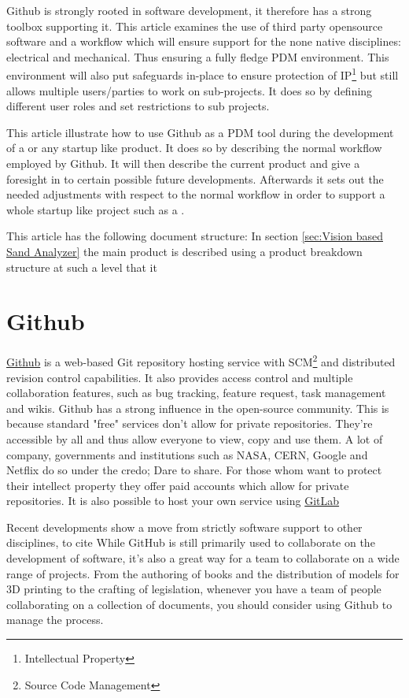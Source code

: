 \documentclass[fleqn,10pt]{SelfArx} %
\begin{document}
Github is strongly rooted in software development, it therefore has a strong toolbox supporting it. This article examines the use of third party opensource software and a workflow which will ensure support for the none native disciplines: electrical and mechanical. Thus ensuring a fully fledge PDM environment. This environment will also put safeguards in-place to ensure protection of IP\footnote{Intellectual Property} but still allows multiple users/parties to work on sub-projects. It does so by defining different user roles and set restrictions to sub projects.

This article illustrate how to use Github as a PDM tool during the development of a \vsa or any startup like product. It does so by describing the normal workflow employed by Github. It will then describe the current product and give a foresight in to certain possible future developments. Afterwards it sets out the needed adjustments with respect to the normal workflow in order to support a whole startup like project such as a \vsa.

This article has the following document structure: In section \ref{sec:Vision based Sand Analyzer} the main product is described using a product breakdown structure at such a level that it

\section{Github}\label{sec:Github}
\href{https://github.com/}{\color{color1}Github} is a web-based Git repository hosting service with SCM\footnote{Source Code Management} and distributed revision control capabilities. It also provides access control and multiple collaboration features, such as bug tracking, feature request, task management and wikis. Github has a strong influence in the open-source community. This is because standard "free" services don't allow for private repositories. They're accessible by all and thus allow everyone to view, copy and use them. A lot of company, governments and institutions such as NASA, CERN, Google and Netflix do so under the credo; Dare to share. 
For those whom want to protect their intellect property they offer paid accounts which allow for private repositories. It is also possible to host your own service using \href{https://about.gitlab.com/}{\color{color1}GitLab} 

Recent developments show a move from strictly software support to other disciplines, to cite \citeauthor{peter_bell_introducing_2015} \cite{peter_bell_introducing_2015} While GitHub is still primarily used to collaborate on the development of software, it’s also a great way for a team to collaborate on a wide range of projects. From the authoring of books and the distribution of models for 3D printing to the crafting of legislation, whenever you have a team of people collaborating on a collection of documents, you should consider using Github to manage the process.
\end{document}
